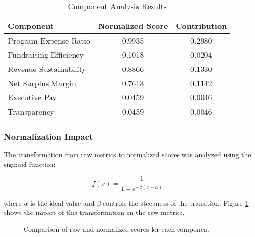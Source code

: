 \documentclass[12pt]{article}
\begin{document}
\begin{table}[H]
\centering
\begin{tabular}{lcc}
\toprule
\textbf{Component} & \textbf{Normalized Score} & \textbf{Contribution} \\
\midrule
Program Expense Ratio & 0.9935 & 0.2980 \\
Fundraising Efficiency & 0.1018 & 0.0204 \\
Revenue Sustainability & 0.8866 & 0.1330 \\
Net Surplus Margin & 0.7613 & 0.1142 \\
Executive Pay & 0.0459 & 0.0046 \\
Transparency & 0.0459 & 0.0046 \\
\bottomrule
\end{tabular}
\caption{Component Analysis Results}
\label{tab:components}
\end{table}

\subsubsection{Normalization Impact}

The transformation from raw metrics to normalized scores was analyzed using the sigmoid function:

\begin{equation}
    f(x) = \frac{1}{1 + e^{-\beta(x - \alpha)}}
\end{equation}

where $\alpha$ is the ideal value and $\beta$ controls the steepness of the transition. Figure \ref{fig:normalization} shows the impact of this transformation on the raw metrics.

\begin{figure}[H]
\centering
{}
\caption{Comparison of raw and normalized scores for each component}
\label{fig:normalization}
\end{figure}
\end{document}

